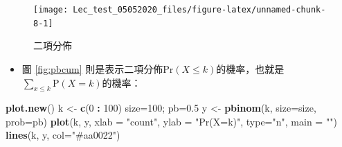 \documentclass[hyperref,]{ctexart}
\newenvironment{Shaded}{\begin{snugshade}}{\end{snugshade}}
\newcommand{\DataTypeTok}[1]{\textcolor[rgb]{0.13,0.29,0.53}{#1}}
\newcommand{\DecValTok}[1]{\textcolor[rgb]{0.00,0.00,0.81}{#1}}
\newcommand{\FloatTok}[1]{\textcolor[rgb]{0.00,0.00,0.81}{#1}}
\newcommand{\KeywordTok}[1]{\textcolor[rgb]{0.13,0.29,0.53}{\textbf{#1}}}
\newcommand{\NormalTok}[1]{#1}
\newcommand{\OperatorTok}[1]{\textcolor[rgb]{0.81,0.36,0.00}{\textbf{#1}}}
\newcommand{\StringTok}[1]{\textcolor[rgb]{0.31,0.60,0.02}{#1}}
\providecommand{\tightlist}{%
  \setlength{\itemsep}{0pt}\setlength{\parskip}{0pt}}
\begin{document}
\begin{Shaded}
\end{Shaded}

\begin{figure}

\texttt{[image: Lec\_test\_05052020\_files/figure-latex/unnamed-chunk-8-1]} \hfill{}

\caption{\label{fig:pbtwotail}二項分佈}\label{fig:unnamed-chunk-8}
\end{figure}

\begin{itemize}
\tightlist
\item
  圖 \ref{fig:pbcum}
  則是表示二項分佈\(\text{Pr}(X\leq k)\)的機率，也就是\(\sum_{x\leq k}\text{P}(X=k)\)的機率：
\end{itemize}

\begin{Shaded}
\begin{Highlighting}[]
\KeywordTok{plot.new}\NormalTok{()}
\NormalTok{k <-}\StringTok{ }\KeywordTok{c}\NormalTok{(}\DecValTok{0} \OperatorTok{:}\StringTok{ }\DecValTok{100}\NormalTok{)}
\NormalTok{size=}\DecValTok{100}\NormalTok{; pb=}\FloatTok{0.5}
\NormalTok{y <-}\StringTok{ }\KeywordTok{pbinom}\NormalTok{(k, }\DataTypeTok{size=}\NormalTok{size, }\DataTypeTok{prob=}\NormalTok{pb)}
\KeywordTok{plot}\NormalTok{(k, y,  }\DataTypeTok{xlab =} \StringTok{"count"}\NormalTok{, }\DataTypeTok{ylab =} \StringTok{"Pr(X=k)"}\NormalTok{, }\DataTypeTok{type=}\StringTok{"n"}\NormalTok{, }\DataTypeTok{main =} \StringTok{""}\NormalTok{)}
\KeywordTok{lines}\NormalTok{(k, y, }\DataTypeTok{col=}\StringTok{"#aa0022"}\NormalTok{)}
\end{Highlighting}
\end{Shaded}
\end{document}
